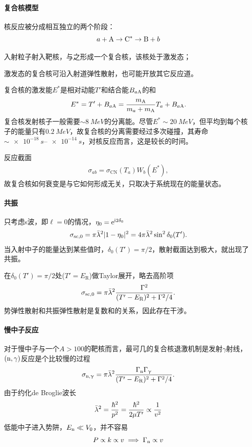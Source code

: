 \paragraph{复合核模型}核反应被分成相互独立的两个阶段：
\[
	a + \mathrm{A} \to \mathrm{C}^\ast \to \mathrm{B} + b
\]
\begin{compactenum}
	\item 入射粒子射入靶核，与之形成一个复合核，该核处于激发态；
	\item 激发态的复合核可沿入射道弹性散射，也可能开放其它反应道。
\end{compactenum}
复合核的激发能$E^\ast$是相对动能$T'$和结合能$B_{a\mathrm{A}}$的和
\begin{align}
	E^\ast = T' + B_{a\mathrm{A}} = \frac{m_{\mathrm{A}}}{m_a + m_{\mathrm{A}}}T_a + B_{a\mathrm{A}}.
\end{align}
复合核发射核子一般需要$\sim \qty{8}{MeV}$的分离能。尽管$E^\ast \sim \qty{20}{MeV}$，但平均到每个核子的能量只有$\qty{0.2}{MeV}$，故复合核的分离需要经过多次碰撞，其寿命$\sim \qtyrange{e-18}{e-14}{s}$，对核反应而言，这是较长的时间。

反应截面
\begin{align}
	\sigma_{ab} = \sigma_{\mathrm{CN}}(T_a)W_b(E^\ast),
\end{align}
故复合核如何衰变是与它如何形成无关，只取决于系统现在的能量状态。
\paragraph{共振}只考虑s波，即$\ell = 0$的情况，$\eta_0 = \mathop{}\!\mathrm{e}^{\mathrm{i}2\delta_0}$
\[
	\sigma_{\mathrm{sc},0} = \pi\bar{\lambda}^2\lvert1 - \eta_0\rvert^2 = 4\pi\bar{\lambda}^2\sin^2\delta_0(T').
\]
当入射中子的能量达到某些值时，$\delta_0(T') = \pi/2$，散射截面达到极大，就出现了共振。

在$\delta_0(T') = \pi/2$处($T' = E_\mathrm R$)做Taylor展开，略去高阶项
\begin{equation}\label{eq:nrd-breit-wigner-elastic}
	\sigma_{\mathrm{sc},0} = \pi\bar{\lambda}^2\frac{\Gamma^2}{(T' - E_\mathrm R)^2 + \Gamma^2/4}.
\end{equation}
势弹性散射和共振弹性散射是复数和的关系，因此存在干涉。
\paragraph{慢中子反应}对于慢中子与一个$A > 100$的靶核而言，最可几的复合核退激机制是发射$\gamma$射线，$(\mathrm n,\gamma)$反应是个比较慢的过程
\begin{equation}\label{eq:nrd-breit-wigner-capture}
	\sigma_{\mathrm n,\upgamma} = \pi\bar{\lambda}^2\frac{\Gamma_\mathrm n\Gamma_\upgamma}{(T' - E_\mathrm R)^2 + \Gamma^2/4}.
\end{equation}
由于约化de Broglie波长
\[
	\bar{\lambda}^2 = \frac{\hbar^2}{p^2} = \frac{\hbar^2}{2\mu T'} \propto \frac1{v^2}
\]
低能中子进入势阱，$E_\mathrm n \ll V_0$，并不容易
\[
	P \propto k \propto v \implies \Gamma_\mathrm n \propto v
\]

